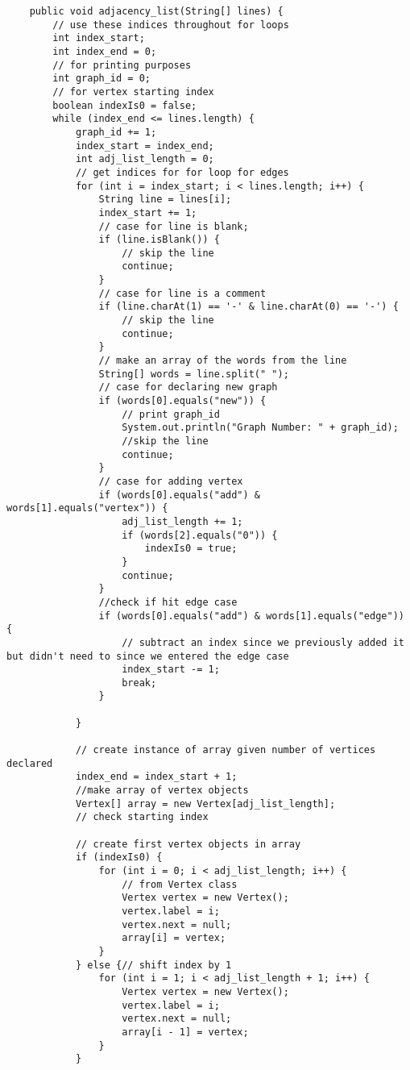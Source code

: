 \documentclass{article}
\begin{document}
\begin{lstlisting}
    public void adjacency_list(String[] lines) {
        // use these indices throughout for loops
        int index_start;
        int index_end = 0;
        // for printing purposes
        int graph_id = 0;
        // for vertex starting index
        boolean indexIs0 = false;
        while (index_end <= lines.length) {
            graph_id += 1;
            index_start = index_end;
            int adj_list_length = 0;
            // get indices for for loop for edges
            for (int i = index_start; i < lines.length; i++) {
                String line = lines[i];
                index_start += 1;
                // case for line is blank;
                if (line.isBlank()) {
                    // skip the line
                    continue;
                }
                // case for line is a comment
                if (line.charAt(1) == '-' & line.charAt(0) == '-') {
                    // skip the line
                    continue;
                }
                // make an array of the words from the line
                String[] words = line.split(" ");
                // case for declaring new graph
                if (words[0].equals("new")) {
                    // print graph_id
                    System.out.println("Graph Number: " + graph_id);
                    //skip the line
                    continue;
                }
                // case for adding vertex
                if (words[0].equals("add") & words[1].equals("vertex")) {
                    adj_list_length += 1;
                    if (words[2].equals("0")) {
                        indexIs0 = true;
                    }
                    continue;
                }
                //check if hit edge case
                if (words[0].equals("add") & words[1].equals("edge")) {
                    // subtract an index since we previously added it but didn't need to since we entered the edge case
                    index_start -= 1;
                    break;
                }

            }

            // create instance of array given number of vertices declared
            index_end = index_start + 1;
            //make array of vertex objects
            Vertex[] array = new Vertex[adj_list_length];
            // check starting index

            // create first vertex objects in array
            if (indexIs0) {
                for (int i = 0; i < adj_list_length; i++) {
                    // from Vertex class
                    Vertex vertex = new Vertex();
                    vertex.label = i;
                    vertex.next = null;
                    array[i] = vertex;
                }
            } else {// shift index by 1
                for (int i = 1; i < adj_list_length + 1; i++) {
                    Vertex vertex = new Vertex();
                    vertex.label = i;
                    vertex.next = null;
                    array[i - 1] = vertex;
                }
            }


\end{lstlisting}
\end{document}
